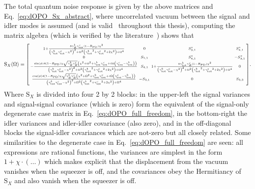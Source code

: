 The total quantum noise response is given by the above matrices and Eq.~\ref{eq:dOPO_Sx_abstract}, where uncorrelated vacuum between the signal and idler modes is assumed (and is valid~\cite{} throughout this thesis), computing the matrix algebra (which is verified by the literature~\cite{}) shows that 
\begin{equation}\label{eq:nOPO_full_freedom}
\text{S}_X(\Omega)=\begin{bsmallmatrix}
1+\frac{8 \gamma^b_R {\gamma^c_\text{tot}} (1-R_\text{PD}) \chi ^2}{\left({\gamma^b_\text{tot}} {\gamma^c_\text{tot}}-\chi ^2\right)^2+\Omega ^2 \left({\gamma^b_\text{tot}}^2+{\gamma^c_\text{tot}}^2+2 \chi ^2\right)+\Omega ^4} & 0 & S_{3,1}^* & S_{4,1}^* \\
0 & S_{1,1} & S_{4,1}^* & -S_{3,1}^* \\
-\frac{\sin (\phi )4 (1-R_\text{PD}) \chi  \sqrt{\gamma^b_R \gamma^c_R}  \left(\chi ^2+\Omega^2+\gamma^b_\text{tot}\gamma^c_\text{tot}+i\Omega\left(\gamma^c_\text{tot}-\gamma^b_\text{tot}\right)\right)}{\left({\gamma^b_\text{tot}} {\gamma^c_\text{tot}}-\chi ^2\right)^2+\Omega ^2 \left({\gamma^b_\text{tot}}^2+{\gamma^c_\text{tot}}^2+2 \chi ^2\right)+\Omega ^4} & S_{4,1} & 1+\frac{8 {\gamma^b_\text{tot}} \gamma^c_R (1-R_\text{PD}) \chi ^2}{\left({\gamma^b_\text{tot}} {\gamma^c_\text{tot}}-\chi ^2\right)^2+\Omega ^2 \left({\gamma^b_\text{tot}}^2+{\gamma^c_\text{tot}}^2+2 \chi ^2\right)+\Omega ^4} & 0\\
\frac{\cos (\phi ) 4 (1-R_\text{PD}) \chi  \sqrt{\gamma^b_R \gamma^c_R} \left(\chi ^2+\Omega^2+\gamma^b_\text{tot}\gamma^c_\text{tot}+i\Omega\left(\gamma^c_\text{tot}-\gamma^b_\text{tot}\right)\right)}{\left({\gamma^b_\text{tot}} {\gamma^c_\text{tot}}-\chi ^2\right)^2+\Omega ^2 \left({\gamma^b_\text{tot}}^2+{\gamma^c_\text{tot}}^2+2 \chi ^2\right)+\Omega ^4} & -S_{3,1} & 0 & S_{3,3}
\end{bsmallmatrix}.\end{equation} 
Where $\text{S}_X$ is divided into four 2 by 2 blocks: in the upper-left the signal variances and signal-signal covariance (which is zero) form the equivalent of the signal-only degenerate case matrix in Eq.~\ref{eq:dOPO_full_freedom}, in the bottom-right the idler variances and idler-idler covariance (also zero), and in the off-diagonal blocks the signal-idler covariances which are not-zero but all closely related. Some similarities to the degenerate case in Eq.~\ref{eq:dOPO_full_freedom} are seen: all expressions are rational functions, the variances are simplest in the form $1+\chi \cdot(\ldots)$ which makes explicit that the displacement from the vacuum vanishes when the squeezer is off, and the covariances obey the Hermitiancy of $\text{S}_X$ and also vanish when the squeezer is off. 

